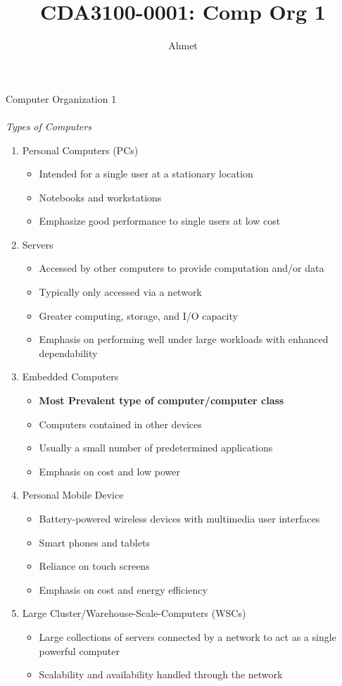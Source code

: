 \documentclass{book}
\title{CDA3100-0001: Comp Org 1}
\author{Ahmet}
\begin{document}
	\noindent Computer Organization 1\\\\
	\emph{Types of Computers}
	\begin{enumerate}
		\item Personal Computers (PCs)
			\begin{itemize}
				\item Intended for a single user at a stationary location
				\item Notebooks and workstations
				\item Emphasize good performance to single users at low cost
			\end{itemize}
		\item Servers
			\begin{itemize}
				\item Accessed by other computers to provide computation and/or data
				\item Typically only accessed via a network
				\item Greater computing, storage, and I/O capacity
				\item Emphasis on performing well under large workloads with enhanced dependability
			\end{itemize}
		\item Embedded Computers
			\begin{itemize}
				\item \textbf{Most Prevalent type of computer/computer class}
				\item Computers contained in other devices
				\item Usually a small number of predetermined applications
				\item Emphasis on cost and low power 
			\end{itemize}
		\item Personal Mobile Device
			\begin{itemize}
				\item Battery-powered wireless devices with multimedia user interfaces
				\item Smart phones and tablets
				\item Reliance on touch screens
				\item Emphasis on cost and energy efficiency 
			\end{itemize}
		\item Large Cluster/Warehouse-Scale-Computers (WSCs)
			\begin{itemize}
				\item Large collections of servers connected by a network to act as a single powerful computer
				\item Scalability and availability handled through the network 
			\end{itemize}
	\end{enumerate}
\end{document}
